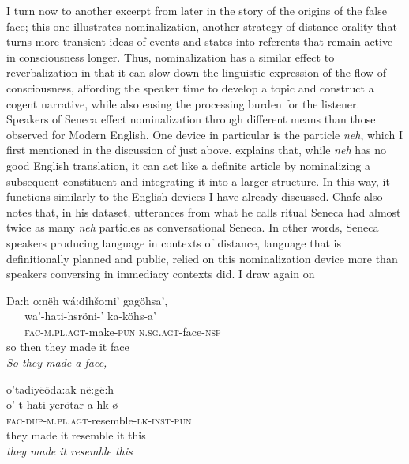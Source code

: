 I turn now to another excerpt from later in the story of the origins of the false face; this one illustrates nominalization, another strategy of distance orality that turns more transient ideas of events and states into referents that remain active in consciousness longer. Thus, nominalization has a similar effect to reverbalization in that it can slow down the linguistic expression of the flow of consciousness, affording the speaker time to develop a topic and construct a cogent narrative, while also easing the processing burden for the listener. Speakers of Seneca effect nominalization through different means than those observed for Modern English. One device in particular is the particle \textit{neh}, which I first mentioned in the discussion of  just above. \citet[138--139]{Chafe1981} explains that, while \textit{neh} has no good English translation, it can act like a definite article by nominalizing a subsequent constituent and integrating it into a larger structure. In this way, it functions similarly to the English devices I have already discussed. Chafe also notes that, in his dataset, utterances from what he calls ritual Seneca had almost twice as many \textit{neh} particles as conversational Seneca. In other words, Seneca speakers producing language in contexts of distance, language that is definitionally planned and public, relied on this nominalization device more than speakers conversing in immediacy contexts did. I draw again on \citet[189--190]{Chafe2014}

\ea%
\label{ex:6:13}
\ea
\gllll Da:h   o:nëh  wá:dihšo:ni’            gagöhsa’,        \\
       ~     ~      wa’-hati-hsröni-’           ka-köhs-a’  \\
       ~     ~ \textsc{fac-m.pl.agt}{}-make-\textsc{pun}     \textsc{n.sg.agt}{}-face-\textsc{nsf}\\
so     then   {they made it}             face\\

\textit{So they made a face,}

\ex
\gllll o’tadiyëöda:ak                 në:gë:h\\
o’-t-hati-yerötar-a-hk-ø               ~\\
\textsc{fac-dup-m.pl.agt}{}-resemble-\textsc{lk-inst-pun} ~\\
{they made it resemble it}             this\\

\textit{they made it resemble this}

